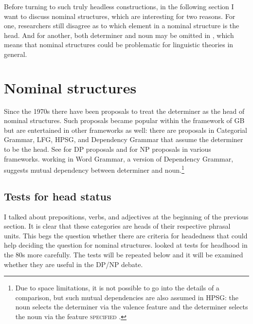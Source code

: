 \documentclass[output=paper
  ,nobabel
  ,draftmode
  ,uniformtopskip %
  ,colorlinks, citecolor=brown
]{langscibook}
\begin{document}
\largerpage
Before turning to such truly headless constructions, in the following section I want to discuss
nominal structures, which are interesting for two reasons. For one, researchers still disagree as to
which element in a nominal structure is the head. And for another, both determiner and noun may be
omitted in , which means that nominal structures could be problematic for linguistic theories
in general.  


\section{Nominal structures}
\label{sec-np-dp}
\label{sec-nominalstrukturen}

Since the 1970s there have been proposals to treat the determiner as the head of nominal structures.
Such proposals became popular within the framework of GB \citep{Chomsky81a} but are entertained in
other frameworks as well: there are proposals in Categorial Grammar, LFG, HPSG, and Dependency
Grammar that assume the determiner to be the head. See \textcites[]{Ajdukiewicz35a-u}{VH77a-u,
Brame82a}[--92]{Hudson84a-u}{Hellan86a,Abney87a,Netter94,Netter98a-Eng,vanLangendonck94a,Salzmann2020a,chapters/salzmann} for DP
proposals and \textcites[]{ps2,Demske2001a}[Section~6.6.1]{MuellerLehrbuch1}{Bruening2009a,Bruening2020a}
for NP proposals in various frameworks. \citet{Hudson2004a} working in Word Grammar, a version of
Dependency Grammar, suggests mutual dependency between determiner and noun.\footnote{%
  Due to space limitations, it is not possible to go into the details of a comparison, but such mutual
  dependencies are also assumed in HPSG: the noun selects the determiner via the valence feature
  \spr and the determiner selects the noun via the feature \textsc{specified} \citep[]{ps2}.
}

\subsection{Tests for head status}

I talked about prepositions, verbs, and adjectives
at the beginning of the previous section. It is clear that these categories are
heads of their respective phrasal units. This begs the question whether there are criteria for headedness
that could help deciding the question for nominal structures. \citet{Zwicky85a} looked at tests for
headhood in the 80s more carefully. The tests will be repeated below and it will be examined
whether they are useful in the DP/NP debate.
\end{document}
